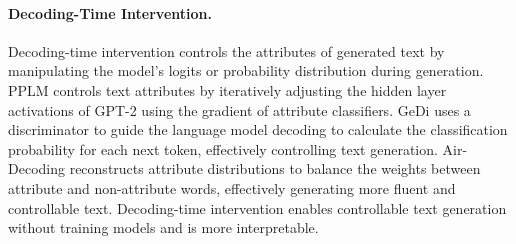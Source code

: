 \paragraph{Decoding-Time Intervention.} Decoding-time intervention controls the attributes of generated text by manipulating the model's logits or probability distribution during generation. PPLM \cite{dathathri2019plug} controls text attributes by iteratively adjusting the hidden layer activations of GPT-2 using the gradient of attribute classifiers. GeDi \cite{krause-etal-2021-gedi-generative} uses a discriminator to guide the language model decoding to calculate the classification probability for each next token, effectively controlling text generation. Air-Decoding \cite{zhong-etal-2023-air} reconstructs attribute distributions to balance the weights between attribute and non-attribute words, effectively generating more fluent and controllable text. Decoding-time intervention enables controllable text generation without training models and is more interpretable.
